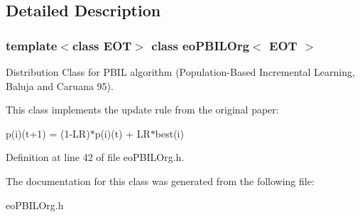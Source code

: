 \subsection{Detailed Description}
\subsubsection*{template$<$class EOT$>$ class eo\-PBILOrg$<$ EOT $>$}

Distribution Class for PBIL algorithm (Population-Based Incremental Learning, Baluja and Caruana 95). 

This class implements the update rule from the original paper:

p(i)(t+1) = (1-LR)$\ast$p(i)(t) + LR$\ast$best(i) 



Definition at line 42 of file eo\-PBILOrg.h.

The documentation for this class was generated from the following file:\begin{CompactItemize}
\item 
eo\-PBILOrg.h\end{CompactItemize}
